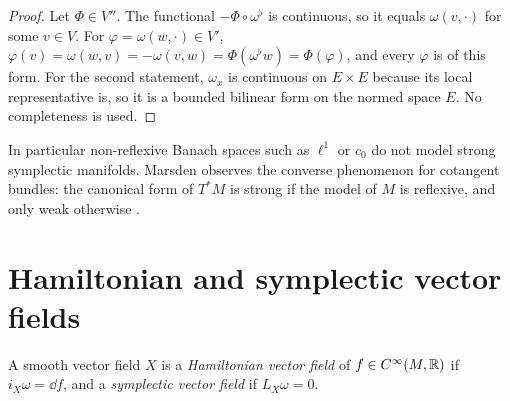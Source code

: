 \begin{proof}
  \leanok
  Let $\Phi \in V''$. The functional $-\Phi \circ \omega^\flat$ is continuous, so it equals
  $\omega(v, \cdot)$ for some $v \in V$. For $\varphi = \omega(w, \cdot) \in V'$,
  $\varphi(v) = \omega(w, v) = -\omega(v, w) = \Phi(\omega^\flat w) = \Phi(\varphi)$, and every
  $\varphi$ is of this form. For the second statement, $\omega_x$ is continuous on $E \times E$
  because its local representative is, so it is a bounded bilinear form on the normed space $E$.
  No completeness is used.
\end{proof}

In particular non-reflexive Banach spaces such as $\ell^1$ or $c_0$ do not model strong
symplectic manifolds. Marsden observes the converse phenomenon for cotangent bundles: the
canonical form of $T^*M$ is strong if the model of $M$ is reflexive, and only weak otherwise
\cite[p.~590]{Mar72}.

\section{Hamiltonian and symplectic vector fields}

\begin{definition}
  \label{def:hamiltonian}
  \leanok
  A smooth vector field $X$ is a \emph{Hamiltonian vector field} of $f \in C^\infty(M, \mathbb{R})$ if
  $i_X \omega = \dd f$, and a \emph{symplectic vector field} if $L_X \omega = 0$.
\end{definition}

